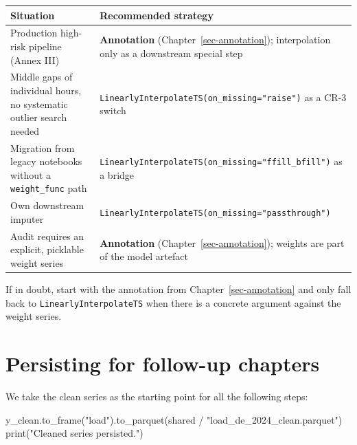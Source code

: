 \documentclass[
  english,
  letterpaper,
]{scrbook}
\newenvironment{Shaded}{\begin{snugshade}}{\end{snugshade}}
\newcommand{\BuiltInTok}[1]{\textcolor[rgb]{0.00,0.23,0.31}{#1}}
\newcommand{\NormalTok}[1]{\textcolor[rgb]{0.00,0.23,0.31}{#1}}
\newcommand{\OperatorTok}[1]{\textcolor[rgb]{0.37,0.37,0.37}{#1}}
\newcommand{\StringTok}[1]{\textcolor[rgb]{0.13,0.47,0.30}{#1}}
\newcounter{none} %
\begin{document}
{\def\LTcaptype{none} %
\begin{longtable}[]{@{}
  >{\raggedright\arraybackslash}p{}
  >{\raggedright\arraybackslash}p{}@{}}
\toprule\noalign{}
\begin{minipage}[b]{\linewidth}\raggedright
Situation
\end{minipage} & \begin{minipage}[b]{\linewidth}\raggedright
Recommended strategy
\end{minipage} \\
\midrule\noalign{}
\endhead
\bottomrule\noalign{}
\endlastfoot
Production high-risk pipeline (Annex III) & \textbf{Annotation}
(Chapter~\ref{sec-annotation}); interpolation only as a downstream
special step \\
Middle gaps of individual hours, no systematic outlier search needed &
\texttt{LinearlyInterpolateTS(on\_missing="raise")} as a CR-3 switch \\
Migration from legacy notebooks without a \texttt{weight\_func} path &
\texttt{LinearlyInterpolateTS(on\_missing="ffill\_bfill")} as a
bridge \\
Own downstream imputer &
\texttt{LinearlyInterpolateTS(on\_missing="passthrough")} \\
Audit requires an explicit, picklable weight series &
\textbf{Annotation} (Chapter~\ref{sec-annotation}); weights are part of
the model artefact \\
\end{longtable}
}

If in doubt, start with the annotation from Chapter~\ref{sec-annotation}
and only fall back to \texttt{LinearlyInterpolateTS} when there is a
concrete argument against the weight series.

\section{Persisting for follow-up
chapters}\label{persisting-for-follow-up-chapters-1}

We take the clean series as the starting point for all the following
steps:

\protect{}\label{persist-clean}
\begin{Shaded}
\begin{Highlighting}[]
\NormalTok{y\_clean.to\_frame(}\StringTok{"load"}\NormalTok{).to\_parquet(shared }\OperatorTok{/} \StringTok{"load\_de\_2024\_clean.parquet"}\NormalTok{)}
\BuiltInTok{print}\NormalTok{(}\StringTok{"Cleaned series persisted."}\NormalTok{)}
\end{Highlighting}
\end{Shaded}
\end{document}
